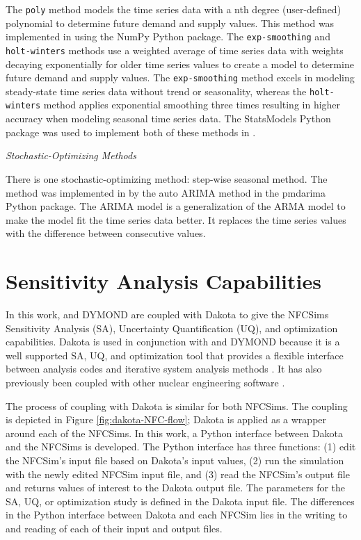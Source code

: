 The \texttt{poly} method models the time series data 
with a nth degree (user-defined) polynomial to determine 
future demand and supply values. 
This method was implemented in \deploy using the 
NumPy \cite{developers_numpy_2013} Python package. 
The \texttt{exp-smoothing} and \texttt{holt-winters} 
methods use a weighted average 
of time series data with weights decaying exponentially 
for older time series values \cite{hyndman_forecasting:_2018}
to create a model to determine future demand and supply values. 
The \texttt{exp-smoothing} method excels in 
modeling steady-state time series data without trend or seasonality, 
whereas the \texttt{holt-winters} method applies exponential 
smoothing three times resulting in higher accuracy when 
modeling seasonal time series data. 
The StatsModels \cite{github_community_statsmodels:_2019}
Python package was used to implement both of these methods 
in \deploy. 

\noindent
\textit{Stochastic-Optimizing Methods}

There is one stochastic-optimizing method: step-wise 
seasonal method. 
The method was implemented in \deploy by the auto \gls{ARIMA} 
method in the pmdarima \cite{noauthor_pmdarima:_2019}
Python package. 
The \gls{ARIMA} model is a generalization of the \gls{ARMA}
model to make the model fit the time series data better. 
It replaces the time series values with the difference
between consecutive values. 

\section{Sensitivity Analysis Capabilities}
In this work, \Cyclus and DYMOND are coupled with Dakota 
\cite{eldred_dakota_2010} to give the \glspl{NFCSim} 
Sensitivity Analysis (\gls{SA}), 
Uncertainty Quantification (\gls{UQ}), and optimization capabilities. 
Dakota is used in conjunction with \Cyclus and DYMOND because it 
is a well supported \gls{SA}, \gls{UQ}, 
and optimization tool that provides a flexible interface between 
analysis codes and iterative system analysis methods 
\cite{turner_virtual_nodate}. 
It has also previously been coupled with other nuclear engineering 
software \cite{turner_virtual_nodate,zhang_uncertainty_nodate}. 

The process of coupling with Dakota is similar 
for both \glspl{NFCSim}. 
The coupling is depicted in Figure \ref{fig:dakota-NFC-flow}; 
Dakota is applied as a wrapper around each of the \glspl{NFCSim}. 
In this work, a Python interface between Dakota and the \glspl{NFCSim}
is developed. 
The Python interface has three functions: 
(1) edit the \gls{NFCSim}'s input file based on Dakota's input values, 
(2) run the simulation with the newly edited \gls{NFCSim} input file, and 
(3) read the \gls{NFCSim}'s output file and returns values of interest 
to the Dakota output file. 
The parameters for the \gls{SA}, \gls{UQ}, or optimization study 
is defined in the Dakota input file. 
The differences in the Python interface between Dakota and each 
\gls{NFCSim} lies in the writing to and reading of 
each of their input and output files. 

